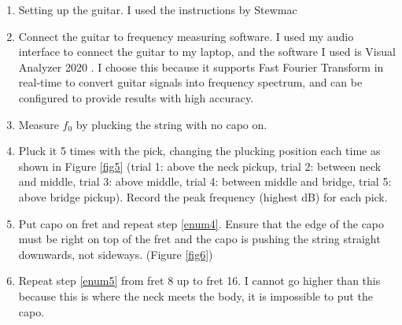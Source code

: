 \begin{enumerate}
    \item Setting up the guitar. I used the instructions by Stewmac \cite{stewmac}
    \item Connect the guitar to frequency measuring software. I used my audio interface to connect the guitar to my laptop, and the software I used is Visual Analyzer 2020 \cite{va20}. I choose this because it supports Fast Fourier Transform in real-time to convert guitar signals into frequency spectrum, and can be configured to provide results with high accuracy. 
    \item Measure $f_0$ by plucking the string with no capo on.
    \item Pluck it 5 times with the pick, changing the plucking position each time as shown in Figure \ref{fig5} (trial 1: above the neck pickup, trial 2: between neck and middle, trial 3: above middle, trial 4: between middle and bridge, trial 5: above bridge pickup). Record the peak frequency (highest dB) for each pick. \label{enum4}
    \item Put capo on  fret and repeat step \ref{enum4}. Ensure that the edge of the capo must be right on top of the fret and the capo is pushing the string straight downwards, not sideways. (Figure \ref{fig6})\label{enum5}
    \item Repeat step \ref{enum5} from fret 8 up to fret 16. I cannot go higher than this because this is where the neck meets the body, it is impossible to put the capo.
\end{enumerate}